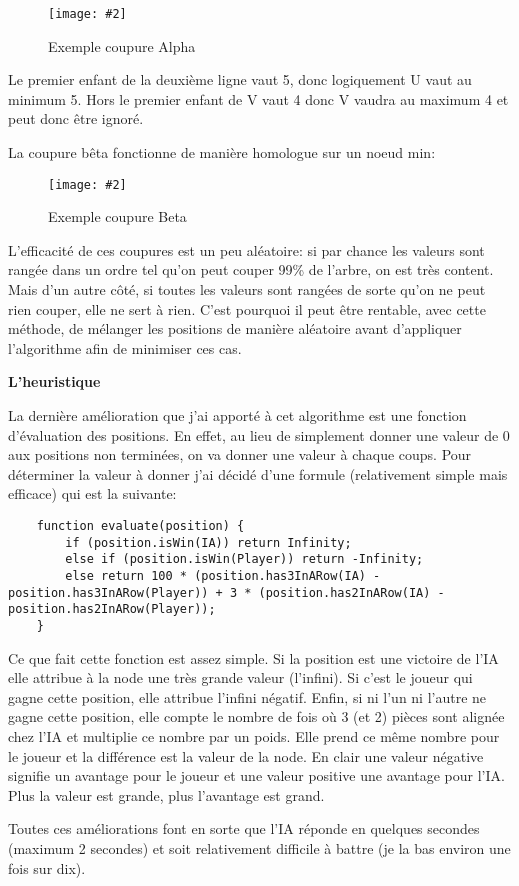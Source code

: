 \documentclass[a4paper]{article}
\newcommand{\img}[3][]{
    \begin{figure}[H]
        \centering
        \texttt{[image: \#2]}
        \caption{#1}    
    \end{figure}
}
\newcommand{\ptitle}[1]{\vspace{10pt}
{\large \noindent \textbf{#1}}}
\begin{document}
    \img[Exemple coupure Alpha]{Images/AlphaCutDemo.png}{0.3}

    Le premier enfant de la deuxième ligne vaut 5, donc logiquement U vaut au minimum 5. Hors le premier enfant de V vaut 4 donc V vaudra au maximum 4 et peut donc être ignoré.

    La coupure bêta fonctionne de manière homologue sur un noeud min: 
    \img[Exemple coupure Beta]{Images/BetaCutDemo.png}{0.3}

    L'efficacité de ces coupures est un peu aléatoire: si par chance les valeurs sont rangée dans un ordre tel qu'on peut couper 99\% de l'arbre, on est très content. Mais d'un autre côté, si toutes les valeurs sont rangées de sorte qu'on ne peut rien couper, elle ne sert à rien. C'est pourquoi il peut être rentable, avec cette méthode, de mélanger les positions de manière aléatoire avant d'appliquer l'algorithme afin de minimiser ces cas.

    \ptitle{L'heuristique}

    La dernière amélioration que j'ai apporté à cet algorithme est une fonction d'évaluation des positions. En effet, au lieu de simplement donner une valeur de 0 aux positions non terminées, on va donner une valeur à chaque coups. Pour déterminer la valeur à donner j'ai décidé d'une formule (relativement simple mais efficace) qui est la suivante: 
    \begin{lstlisting}
    function evaluate(position) {
        if (position.isWin(IA)) return Infinity;
        else if (position.isWin(Player)) return -Infinity;
        else return 100 * (position.has3InARow(IA) - position.has3InARow(Player)) + 3 * (position.has2InARow(IA) - position.has2InARow(Player));
    }
    \end{lstlisting}
    Ce que fait cette fonction est assez simple. Si la position est une victoire de l'IA elle attribue à la node une très grande valeur (l'infini). Si c'est le joueur qui gagne cette position, elle attribue l'infini négatif. Enfin, si ni l'un ni l'autre ne gagne cette position, elle compte le nombre de fois où 3 (et 2) pièces sont alignée chez l'IA et multiplie ce nombre par un poids. Elle prend ce même nombre pour le joueur et la différence est la valeur de la node. En clair une valeur négative signifie un avantage pour le joueur et une valeur positive une avantage pour l'IA. Plus la valeur est grande, plus l'avantage est grand.

    Toutes ces améliorations font en sorte que l'IA réponde en quelques secondes (maximum 2 secondes) et soit relativement difficile à battre (je la bas environ une fois sur dix).
\end{document}
